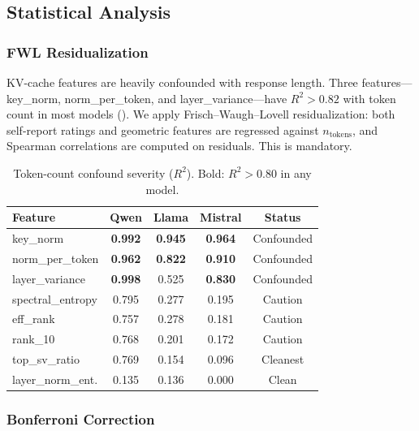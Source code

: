 \documentclass[11pt,a4paper]{article}
\begin{document}
\subsection{Statistical Analysis}

\subsubsection{FWL Residualization}

KV-cache features are heavily confounded with response length. Three features---key\_norm, norm\_per\_token, and layer\_variance---have $R^2 > 0.82$ with token count in most models (). We apply Frisch--Waugh--Lovell residualization: both self-report ratings and geometric features are regressed against $n_{\text{tokens}}$, and Spearman correlations are computed on residuals. This is mandatory.

\begin{table}[H]
\centering
\caption{Token-count confound severity ($R^2$). Bold: $R^2 > 0.80$ in any model.}
\label{tab:confound}
\begin{tabular}{lcccc}
\toprule
\textbf{Feature} & \textbf{Qwen} & \textbf{Llama} & \textbf{Mistral} & \textbf{Status} \\
\midrule
key\_norm           & \textbf{0.992} & \textbf{0.945} & \textbf{0.964} & Confounded \\
norm\_per\_token    & \textbf{0.962} & \textbf{0.822} & \textbf{0.910} & Confounded \\
layer\_variance     & \textbf{0.998} & 0.525          & \textbf{0.830} & Confounded \\
spectral\_entropy   & 0.795          & 0.277          & 0.195          & Caution \\
eff\_rank           & 0.757          & 0.278          & 0.181          & Caution \\
rank\_10            & 0.768          & 0.201          & 0.172          & Caution \\
top\_sv\_ratio      & 0.769          & 0.154          & 0.096          & Cleanest \\
layer\_norm\_ent.   & 0.135          & 0.136          & 0.000          & Clean \\
\bottomrule
\end{tabular}
\end{table}

\subsubsection{Bonferroni Correction}
\end{document}
